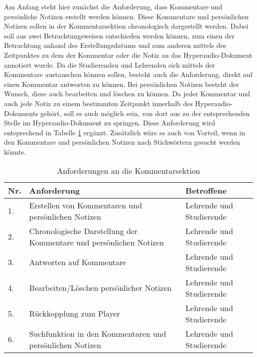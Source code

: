 Am Anfang steht hier zunächst die Anforderung, dass Kommentare und persönliche Notizen erstellt werden können. Diese Kommentare und persönlichen Notizen sollen in der Kommentarsektion chronologisch dargestellt werden. Dabei soll aus zwei Betrachtungsweisen entschieden werden können, zum einen der Betrachtung anhand des Erstellungsdatums und zum anderen mittels des Zeitpunktes zu dem der Kommentar oder die Notiz an das Hyperaudio-Dokument annotiert wurde. Da die Studierenden und Lehrenden sich mittels der Kommentare austauschen können sollen, besteht auch die Anforderung, direkt auf einen Kommentar antworten zu können. Bei persönlichen Notizen besteht der Wunsch, diese auch bearbeiten und löschen zu können. Da jeder Kommentar und auch jede Notiz zu einem bestimmten Zeitpunkt innerhalb des Hyperaudio-Dokuments gehört, soll es auch möglich sein, von dort aus zu der entsprechenden Stelle im Hyperaudio-Dokument zu springen. Diese Anforderung wird entsprechend in Tabelle \ref{tab:AnforderungenKommentarsektion} ergänzt. Zusätzlich wäre es auch von Vorteil, wenn in den Kommentare und persönlichen Notizen nach Stichwörtern gesucht werden könnte.

\begin{table}[!ht]
\def\arraystretch{1.4}
\caption{Anforderungen an die Kommentarsektion}
\label{tab:AnforderungenKommentarsektion}
 \begin{tabularx}{\textwidth}{lXl}      
    \hline
    Nr. & Anforderung & Betroffene 
    \\\hline
    1. & Erstellen von Kommentaren und persönlichen Notizen & Lehrende und Studierende\\
    2. & Chronologische Darstellung der Kommentare und persönlichen Notizen & Lehrende und Studierende\\
    3. & Antworten auf Kommentare & Lehrende und Studierende\\
    4. & Bearbeiten/Löschen persönlicher Notizen & Lehrende und Studierende\\
    5. & Rückkopplung zum Player & Lehrende und Studierende\\
    6. & Suchfunktion in den Kommentaren und persönlichen Notizen & Lehrende und Studierende\\
    \hline
    \end{tabularx}
\end{table}

